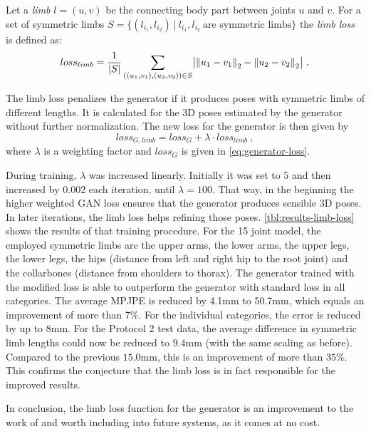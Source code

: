 Let a \emph{limb} $l = (u, v)$ be the connecting body part between joints $u$ and $v$.
For a set of symmetric limbs $S = \{(l_{i_1}, l_{i_2})~|~ l_{i_1}, l_{i_2}\ \text{are symmetric limbs} \}$ the \emph{limb loss} is defined as:
\begin{equation}
loss_{limb} = \frac{1}{|S|}\sum_{((u_1, v_1), (u_2, v_2)) \in S} \bigl\lvert \norm{u_1 - v_1}_2 - \norm{u_2 - v_2}_2 \bigr\rvert \ .
\end{equation}

The limb loss penalizes the generator if it produces poses with symmetric limbs of different lengths.
It is calculated for the 3D poses estimated by the generator without further normalization.
The new loss for the generator is then given by
\begin{equation}
	loss_{G, limb} = loss_G + \lambda \cdot loss_{limb} \ ,
\end{equation}
where $\lambda$ is a weighting factor and $loss_G$ is given in \autoref{eq:generator-loss}.



During training, $\lambda$ was increased linearly.
Initially it was set to $5$ and then increased by $0.002$ each iteration, until $\lambda = 100$.
That way, in the beginning the higher weighted GAN loss ensures that the generator produces sensible 3D poses. 
In later iterations, the limb loss helps refining those poses.
\autoref{tbl:results-limb-loss} shows the results of that training procedure.
For the 15 joint model, the employed symmetric limbs are the upper arms, the lower arms, the upper legs, the lower legs, the hips (distance from left and right hip to the root joint) and the collarbones (distance from shoulders to thorax). 
The generator trained with the modified loss is able to outperform the generator with standard loss in all categories.
The average MPJPE is reduced by 4.1mm to 50.7mm, which equals an improvement of more than 7\%.
For the individual categories, the error is reduced by up to 8mm.
For the Protocol 2 test data, the average difference in symmetric limb lengths could now be reduced to $9.4$mm (with the same scaling as before).
Compared to the previous $15.0$mm, this is an improvement of more than $35\%$.
This confirms the conjecture that the limb loss is in fact responsible for the improved results.

In conclusion, the limb loss function for the generator is an improvement to the work of \citet{drover18} and worth including into future systems, as it comes at no cost.



